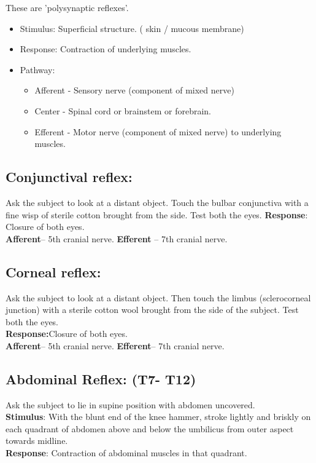 \documentclass[a4paper,12pt,openany,twoside]{book}
\begin{document}
These are 'polysynaptic reflexes'.
\begin{itemize}
\item{Stimulus: Superficial structure. ( skin / mucous membrane)}
\item{Response: Contraction of underlying muscles.}
\item{Pathway:}
	\begin{itemize}
\item{Afferent - Sensory nerve (component of mixed nerve)}
\item{Center - Spinal cord or brainstem or forebrain.}
\item{Efferent - Motor nerve (component of mixed nerve) to underlying muscles.}
	\end{itemize}
\end{itemize}
\subsection*{Conjunctival reflex:}
	Ask the subject to look at a distant object. Touch the bulbar conjunctiva with a fine wisp of sterile cotton brought from the side. Test both the eyes.\newline
\textbf{Response}: Closure of both eyes.\\  
\textbf{Afferent}– 5th cranial nerve. \textbf{Efferent} – 7th cranial nerve.
\subsection*{Corneal reflex:}
Ask the subject to look at a distant object. Then touch the limbus (sclerocorneal junction) with a sterile cotton wool brought from the side of the subject. Test both the eyes.\\
\textbf{Response:}Closure of both eyes.\\
\textbf{Afferent}– 5th cranial nerve. \textbf{Efferent}– 7th cranial nerve.
\subsection*{Abdominal Reflex: (T7- T12)}
Ask the subject to lie in supine position with abdomen uncovered.\\
\textbf{Stimulus}: With the blunt end of the knee hammer, stroke lightly and briskly on each quadrant of abdomen above and below the umbilicus from outer aspect towards midline.\\
\textbf{Response}: Contraction of abdominal muscles in that quadrant.
\end{document}
